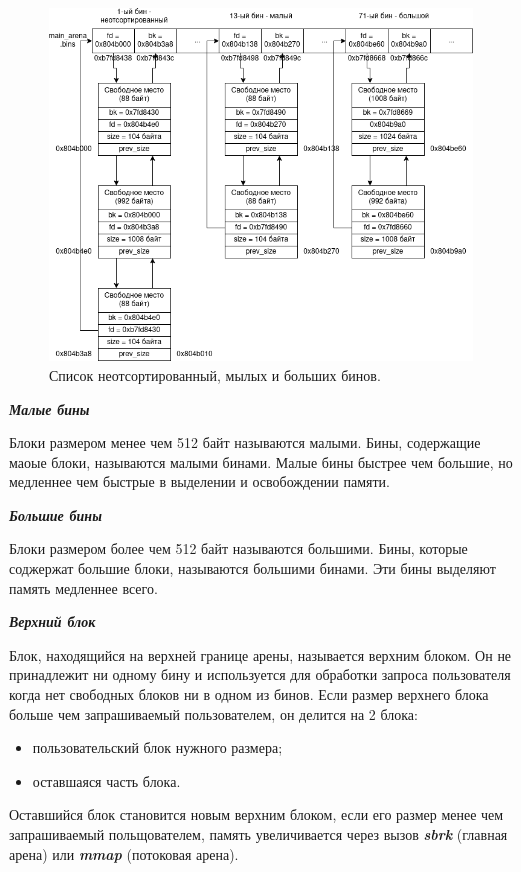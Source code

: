 \begin{figure}[!h]
	\begin{center}
		\includegraphics[scale=0.6]{images/glibc-malloc-all-bins.png}
		\caption{Список неотсортированный, мылых и больших бинов.}
		\label{glibc-malloc-all-bins}
	\end{center}
\end{figure}

\bigbreak
\textit{\textbf{Малые бины}}

Блоки размером менее чем 512 байт называются малыми. Бины, содержащие маоые блоки, называются малыми бинами. Малые бины быстрее чем большие, но медленнее чем быстрые в выделении и освобождении памяти.

\textit{\textbf{Большие бины}}

Блоки размером более чем 512 байт называются большими. Бины, которые соджержат большие блоки, называются большими бинами. Эти бины выделяют память медленнее всего.

\textit{\textbf{Верхний блок}}
	
Блок, находящийся на верхней границе арены, называется верхним блоком. Он не принадлежит ни одному бину и используется для обработки запроса пользователя когда нет свободных блоков ни в одном из бинов. Если размер верхнего блока больше чем запрашиваемый пользователем, он делится на 2 блока:
\begin{itemize}
	\item пользовательский блок нужного размера;
	\item оставшаяся часть блока.
\end{itemize}
Оставшийся блок становится новым верхним блоком, если его размер менее чем запрашиваемый польщователем, память увеличивается через вызов \textit{\textbf{sbrk}} (главная арена) или \textit{\textbf{mmap}} (потоковая арена).

